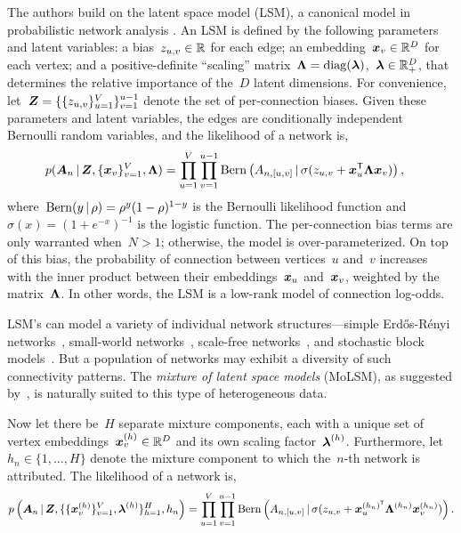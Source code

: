The authors build on the latent space model (LSM), a canonical model
in probabilistic network analysis \citep{hoff2002latent,
  hoff2008modeling}. An LSM is defined by the following parameters and
latent variables: a bias~${z_{u,v} \in \mathbb{R}}$ for each edge; an
embedding~${\boldsymbol{x}_v \in \mathbb{R}^D}$ for each vertex; and a
positive-definite ``scaling''
matrix~${\boldsymbol{\Lambda} = \operatorname{diag}(\boldsymbol{\lambda})}$,~$\boldsymbol{\lambda} \in \mathbb{R}_+^D$, that
determines the relative importance of the~$D$ latent dimensions.  For
convenience, let~${\boldsymbol{Z} = \{\{z_{u,v}\}_{u=1}^V\}_{v=1}^{u-1}}$ denote
the set of per-connection biases.  Given these parameters and latent
variables, the edges are conditionally independent Bernoulli random
variables, and the likelihood of a network is,
\begin{align}
  p(\boldsymbol{A}_{n} \, | \, \boldsymbol{Z}, \{\boldsymbol{x}_v\}_{v=1}^V, \boldsymbol{\Lambda})
  &= \prod_{u=1}^V \prod_{v=1}^{u-1} \mathrm{Bern} \left(A_{n, [u,v]} \, | \,
    \sigma(z_{u,v} + \boldsymbol{x}_u^{\mathsf{T}} \boldsymbol{\Lambda} \boldsymbol{x}_v)\right),
\end{align}
where~${\mathrm{Bern}(y \, | \, \rho) = \rho^y (1-\rho)^{1-y}}$ is the Bernoulli likelihood function
and~${\sigma(x) = (1+e^{-x})^{-1}}$ is the logistic function.
The per-connection bias terms are only warranted
when~${N > 1}$; otherwise, the model is over-parameterized.
On top of this bias, the probability of connection between vertices~$u$
and~$v$ increases with the inner product between their embeddings~$\boldsymbol{x}_u$
and~$\boldsymbol{x}_v$, weighted by the matrix~$\boldsymbol{\Lambda}$. In other words, the LSM is a
low-rank model of connection log-odds.

LSM's can model a variety of individual network structures---simple
Erd\H{o}s-R\'{e}nyi networks~\citep{erdos1959random}, small-world
networks~\citep{watts1998collective}, scale-free
networks~\citep{barabasi1999emergence}, and stochastic block
models~\citep{nowicki2001estimation}.  But a
population of networks may exhibit a diversity of such connectivity
patterns.  The \emph{mixture of latent space models} (MoLSM), as suggested
by~\citet{durante2016nonparametric}, is naturally suited to this type
of heterogeneous data.

Now let there
be~$H$ separate mixture components, each with 
a unique set of vertex embeddings~${\boldsymbol{x}_v^{(h)} \in \mathbb{R}^D}$
and its own scaling factor~$\boldsymbol{\lambda}^{(h)}$. Furthermore,
let~${h_n \in \{1, \ldots, H\}}$ denote the mixture component
to which the~$n$-th network is attributed. 
The likelihood of a network is,
\begin{align}
  \label{eq:molsm_lkhd}
  p \left(\boldsymbol{A}_n \, | \,
    \boldsymbol{Z}, \{\{\boldsymbol{x}_v^{(h)}\}_{v=1}^V,
  \boldsymbol{\lambda}^{(h)}\}_{h=1}^H, h_n \right) 
  = \prod_{u=1}^V \prod_{v=1}^{u-1}
  \mathrm{Bern} \left(A_{n,[u,v]} \, | \,
    \sigma(z_{u,v} + \boldsymbol{x}_{u}^{(h_n)^{\mathsf{T}}} \boldsymbol{\Lambda}^{(h_n)} \boldsymbol{x}_v^{(h_n)}) \right).
\end{align}

